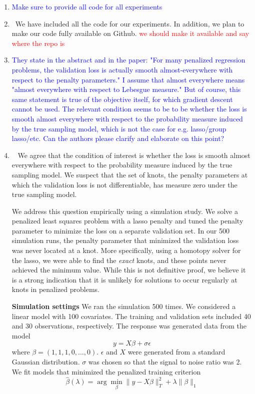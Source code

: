 \documentclass[]{article}
\newcommand{\point}[1]{\item \textcolor{blue}{#1}}
\newcommand{\reply}{\item[]\ }
\begin{document}
\begin{enumerate}
		\point{Make sure to provide all code for all experiments}
		
		\reply We have included all the code for our experiments. In addition, we plan to make our code fully available on Github. \textcolor{red}{we should make it available and say where the repo is}
		
		\point{They state in the abstract and in the paper: "For many penalized regression problems, the validation loss is actually smooth almost-everywhere with respect to the penalty parameters."  I assume that almost everywhere means "almost everywhere with respect to Lebesgue measure."  But of course, this same statement is true of the objective itself, for which gradient descent cannot be used.  The relevant condition seems to be to be whether the loss is smooth almost everywhere with respect to the probability measure induced by the true sampling model, which is not the case for e.g. lasso/group lasso/etc.  Can the authors please clarify and elaborate on this point?}
		
		\reply 	
		We agree that the condition of interest is whether the loss is smooth almost everywhere with respect to the probability measure induced by the true sampling model. We suspect that the set of knots, the penalty parameters at which the validation loss is not differentiable, has measure zero under the true sampling model. 
		
		We address this question empirically using a simulation study. We solve a penalized least squares problem with a lasso penalty and tuned the penalty parameter to minimize the loss on a separate validation set. In our 500 simulation runs, the penalty parameter that minimized the validation loss was never located at a knot. More specifically, using a homotopy solver for the lasso, we were able to find the \emph{exact} knots, and these points never achieved the minimum value. While this is not definitive proof, we believe it is a strong indication that it is unlikely for solutions to occur regularly at knots in penalized problems.
		
		\textbf{Simulation settings} We ran the simulation 500 times. We considered a linear model with 100 covariates. The training and validation sets included 40 and 30 observations, respectively. The response was generated data from the model
		$$
		y = X\beta + \sigma\epsilon
		$$
		where $\beta = (1, 1, 1, 0, ..., 0)$. $\epsilon$ and $X$ were generated from a standard Gaussian distribution. $\sigma$ was chosen so that the signal to noise ratio was 2. We fit models that minimized the penalized training criterion
		$$
		\hat{\beta}(\lambda) = \arg\min_{\beta} \| y - X\beta \|_T^2 + \lambda \|\beta\|_1
		$$
		
	\end{enumerate}
\end{document}
